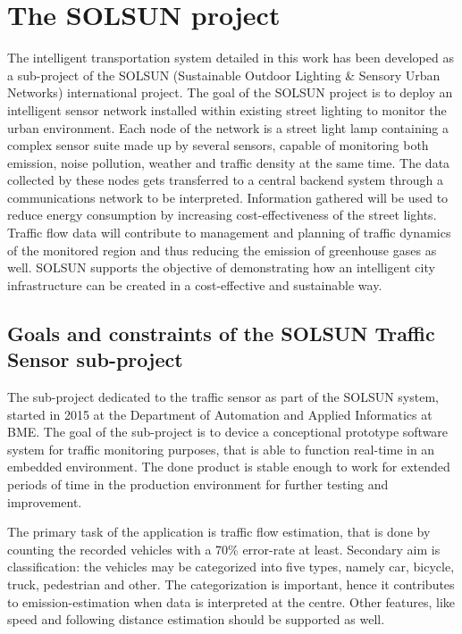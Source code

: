 \section{The SOLSUN project}
The intelligent transportation system detailed in this work has been developed as a sub-project of the SOLSUN (Sustainable Outdoor Lighting \& Sensory Urban Networks) international project\cite{SOLSUN}.
The goal of the SOLSUN project is to deploy an intelligent sensor network installed within existing street lighting to monitor the urban environment.
Each node of the network is a street light lamp containing a complex sensor suite made up by several sensors, capable of monitoring both emission, noise pollution, weather and traffic density at the same time.
The data collected by these nodes gets transferred to a central backend system through a communications network to be interpreted.
Information gathered will be used to reduce energy consumption by increasing cost-effectiveness of the street lights.
Traffic flow data will contribute to management and planning of traffic dynamics of the monitored region and thus reducing the emission of greenhouse gases as well.
SOLSUN supports the objective of demonstrating how an intelligent city infrastructure can be created in a cost-effective and sustainable way.

\subsection{Goals and constraints of the SOLSUN Traffic Sensor sub-project}
The sub-project dedicated to the traffic sensor as part of the SOLSUN system, started in 2015 at the Department of Automation and Applied Informatics at BME\cite{SOLSUN_BME}.
The goal of the sub-project is to device a conceptional prototype software system for traffic monitoring purposes, that is able to function real-time in an embedded environment.
The done product is stable enough to work for extended periods of time in the production environment for further testing and improvement.

The primary task of the application is traffic flow estimation, that is done by counting the recorded vehicles with a 70\% error-rate at least.
Secondary aim is classification: the vehicles may be categorized into five types, namely car, bicycle, truck, pedestrian and other.
The categorization is important, hence it contributes to emission-estimation when data is interpreted at the centre\cite{}.
Other features, like speed and following distance estimation should be supported as well.

